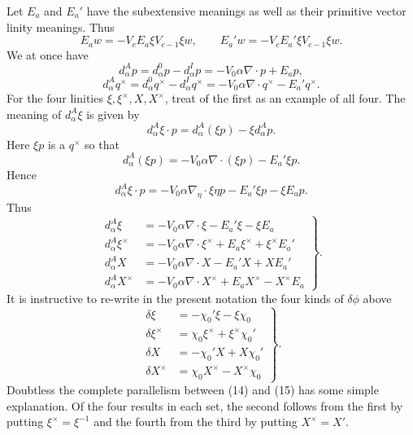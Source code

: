 \documentclass[11pt]{article}
\begin{document}
\indent Let $E_a$ and $E_a'$ have the subextensive meanings as well as their primitive vector linity meanings. Thus
\begin{equation}E_aw=-V_cE_a\xi V_{c-1}\xi w,\qquad E_a'w=-V_cE_a'\xi V_{c-1}\xi w.\tag{11}\end{equation}
We at once have
\begin{equation}d_{\alpha}^{A}p=d_{\alpha}^{0}p-d_{\alpha}^{I}p=-V_0\alpha\nabla\cdot p+E_ap,\tag{12}\end{equation}
\begin{equation}d_{\alpha}^{A}q^\times=d_{\alpha}^{0}q^\times-d_{\alpha}^{I}q^\times=-V_0\alpha\nabla\cdot q^\times-E_a'q^\times.\tag{13}\end{equation}
For the four linities $\xi,\xi^\times,X,X^\times$, treat of the first as an example of all four. The meaning of $d_{\alpha}^{A}\xi$ is given by
\[
d_{\alpha}^{A}\xi\cdot p=d_{\alpha}^{A}(\xi p)-\xi d_{\alpha}^{A}p.
\]
Here $\xi p$ is a $q^\times$ so that
\[
d_{\alpha}^{A}(\xi p)=-V_0\alpha\nabla\cdot(\xi p)-E_a'\xi p.
\]
Hence
\[
d_{\alpha}^{A}\xi\cdot p=-V_0\alpha\nabla_\eta\cdot\xi\eta p-E_a'\xi p-\xi E_ap.
\]
Thus
\begin{equation}\left.\begin{aligned}
d_{\alpha}^{A}\xi&=-V_0\alpha\nabla\cdot\xi-E_a'\xi-\xi E_a\\
d_{\alpha}^{A}\xi^\times&=-V_0\alpha\nabla\cdot\xi^\times+E_a\xi^\times+\xi^\times E_a'\\
d_{\alpha}^{A}X&=-V_0\alpha\nabla\cdot X-E_a'X+XE_a'\\
d_{\alpha}^{A}X^\times&=-V_0\alpha\nabla\cdot X^\times+E_aX^\times-X^\times E_a
\end{aligned}\right\}.\tag{14}\end{equation}
It is instructive to re-write in the present notation the four kinds of $\delta\phi$ above
\begin{equation}\left.\begin{aligned}
\delta\xi&=-\chi_0'\xi-\xi\chi_0\\
\delta\xi^\times&=\chi_0\xi^\times+\xi^\times\chi_0'\\
\delta X&=-\chi_0'X+X\chi_0'\\
\delta X^\times&=\chi_0X^\times-X^\times\chi_0
\end{aligned}\right\}.\tag{15}\end{equation}
Doubtless the complete parallelism between (14) and (15) has some simple explanation. Of the four results in each set, the second follows from the first by putting $\xi^\times=\xi^{-1}$ and the fourth from the third by putting $X^\times=X'$.
\end{document}
